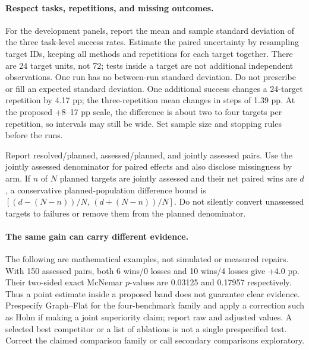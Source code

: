 \paragraph{Respect tasks, repetitions, and missing outcomes.}
For the development panels, report the mean and sample standard deviation of
the three task-level success rates. Estimate the paired uncertainty by
resampling target IDs, keeping all methods and repetitions for each target
together. There are 24 target units, not 72; tests inside a target are
not additional independent observations. One run has no between-run standard
deviation. Do not prescribe or fill an expected standard deviation.
One additional success changes a 24-target repetition by 4.17 pp; the
three-repetition mean changes in steps of 1.39 pp. At the proposed +8--17 pp
scale, the difference is about two to four targets per repetition, so intervals
may still be wide. Set sample size and stopping rules before the runs.

Report resolved/planned, assessed/planned, and jointly assessed pairs.
Use the jointly assessed denominator for paired effects and also disclose
missingness by arm. If $n$ of $N$ planned targets are jointly assessed and their
net paired wins are $d$, a conservative planned-population difference bound is
$[(d-(N-n))/N,\,(d+(N-n))/N]$. Do not silently convert unassessed targets to
failures or remove them from the planned denominator.

\paragraph{The same gain can carry different evidence.}
The following are mathematical examples, not simulated or measured repairs.
With 150 assessed pairs, both 6 wins/0 losses and 10 wins/4 losses give +4.0 pp.
Their two-sided exact McNemar $p$-values are 0.03125 and 0.17957 respectively.
Thus a point estimate inside a proposed band does not guarantee clear evidence.
Prespecify Graph--Flat for the four-benchmark family and apply a correction
such as Holm if making a joint superiority claim; report raw and adjusted
values. A selected best competitor or a list of ablations is not a single
prespecified test. Correct the claimed comparison family or call secondary
comparisons exploratory.

